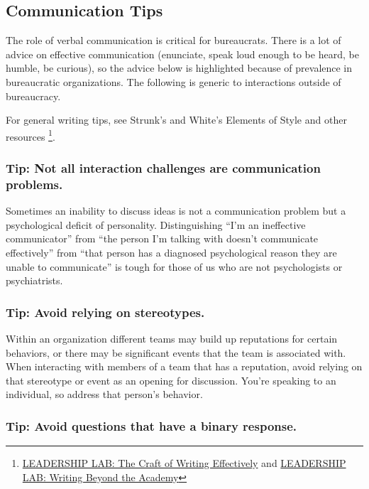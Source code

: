 \subsection{Communication Tips}

The role of verbal communication is critical for bureaucrats. 
There is a lot of advice on effective communication (enunciate, speak loud enough to be heard, be humble, be curious), so the advice below is highlighted because of prevalence in bureaucratic organizations. 
The following is generic to interactions outside of bureaucracy. 

For general writing tips, see Strunk's and White's Elements of Style and other resources \footnote{\href{https://www.youtube.com/watch?v=vtIzMaLkCaM}{LEADERSHIP LAB: The Craft of Writing Effectively} and \href{https://www.youtube.com/watch?v=aFwVf5a3pZM}{LEADERSHIP LAB: Writing Beyond the Academy}}.

\subsubsection{Tip: Not all interaction challenges are communication problems.}
Sometimes an inability to discuss ideas is not a communication problem but a psychological deficit of personality. Distinguishing ``I'm an ineffective communicator'' from ``the person I'm talking with doesn't communicate effectively'' from ``that person has a diagnosed psychological reason they are unable to communicate'' is tough for those of us who are not psychologists or psychiatrists. 


\subsubsection{Tip: Avoid relying on stereotypes.}
Within an organization different teams may build up reputations for certain behaviors, or there may be significant events that the team is associated with. 
When interacting with members of a team that has a reputation, avoid relying on that stereotype or event as an opening for discussion. 
You're speaking to an individual, so address that person's behavior.



\subsubsection{Tip: Avoid questions that have a binary response\label{sec:yes_no_questions}.}


